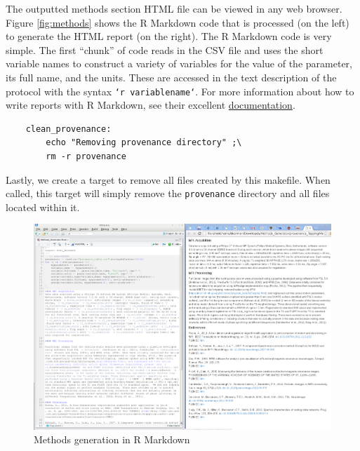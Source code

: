 The outputted methods section HTML file can be viewed in any web browser. Figure \autoref{fig:methods} shows the R Markdown code that is processed (on the left) to generate the HTML report (on the right). The R Markdown code is very simple. The first ``chunk'' of code reads in the CSV file and uses the short variable names to construct a variety of variables for the value of the parameter, its full name, and the units. These are accessed in the text description of the protocol with the syntax \texttt{`r variablename`}. For more information about how to write reports with R Markdown, see their excellent \href{http://rmarkdown.rstudio.com}{documentation}. 

\begin{lstlisting}
	clean_provenance:
		echo "Removing provenance directory" ;\
		rm -r provenance
\end{lstlisting}

Lastly, we create a target to remove all files created by this makefile. When called, this target will simply remove the \texttt{provenance} directory and all files located within it.



\begin{figure}
	\begin{center}
		\includegraphics[width=7in]{images/MethodsGenerator.png}
		\caption{Methods generation in R Markdown}
                \label{fig:methods}
	\end{center}
\end{figure}